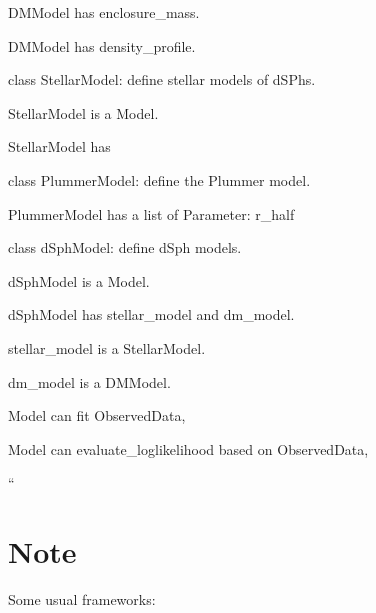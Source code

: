 \begin{DoxyItemize}
\begin{DoxyItemize}
\item {\ttfamily D\+M\+Model} has {\ttfamily enclosure\+\_\+mass}.
\item {\ttfamily D\+M\+Model} has {\ttfamily density\+\_\+profile}.
\end{DoxyItemize}
\item class {\ttfamily Stellar\+Model}\+: define stellar models of d\+S\+Phs.
\begin{DoxyItemize}
\item {\ttfamily Stellar\+Model} is a {\ttfamily Model}.
\item {\ttfamily Stellar\+Model} has
\end{DoxyItemize}
\item class {\ttfamily Plummer\+Model}\+: define the Plummer model.
\begin{DoxyItemize}
\item {\ttfamily Plummer\+Model} has a {\ttfamily list} of {\ttfamily Parameter}\+: {\ttfamily r\+\_\+half}
\end{DoxyItemize}
\item class {\ttfamily d\+Sph\+Model}\+: define d\+Sph models.
\begin{DoxyItemize}
\item {\ttfamily d\+Sph\+Model} is a {\ttfamily Model}.
\item {\ttfamily d\+Sph\+Model} has {\ttfamily stellar\+\_\+model} and {\ttfamily dm\+\_\+model}.
\begin{DoxyItemize}
\item {\ttfamily stellar\+\_\+model} is a {\ttfamily Stellar\+Model}.
\item {\ttfamily dm\+\_\+model} is a {\ttfamily D\+M\+Model}.
\end{DoxyItemize}
\item {\ttfamily Model} can {\ttfamily fit} {\ttfamily Observed\+Data},
\item {\ttfamily Model} can {\ttfamily evaluate\+\_\+loglikelihood} based on {\ttfamily Observed\+Data},
\end{DoxyItemize}
\item ``
\item 
\item 
\end{DoxyItemize}

\section*{Note}

Some usual frameworks\+:


